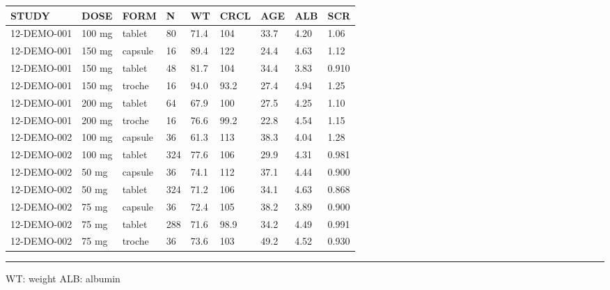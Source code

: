 \documentclass[
]{article}
\newenvironment{Shaded}{\begin{snugshade}}{\end{snugshade}}
\newcommand{\ControlFlowTok}[1]{\textcolor[rgb]{0.13,0.29,0.53}{\textbf{#1}}}
\newcommand{\DataTypeTok}[1]{\textcolor[rgb]{0.13,0.29,0.53}{#1}}
\newcommand{\KeywordTok}[1]{\textcolor[rgb]{0.13,0.29,0.53}{\textbf{#1}}}
\newcommand{\NormalTok}[1]{#1}
\newcommand{\OperatorTok}[1]{\textcolor[rgb]{0.81,0.36,0.00}{\textbf{#1}}}
\newcommand{\StringTok}[1]{\textcolor[rgb]{0.31,0.60,0.02}{#1}}
\begin{document}
\begin{table}[h]
\centering
{\def\arraystretch{1.4}\tabcolsep=5pt
\begin{threeparttable}
\begin{tabular}[h]{lllllllll}
\hline
STUDY & DOSE & FORM & N & WT & CRCL & AGE & ALB & SCR \\
\hline
12-DEMO-001 & 100 mg & tablet & 80 & 71.4 & 104 & 33.7 & 4.20 & 1.06 \\
12-DEMO-001 & 150 mg & capsule & 16 & 89.4 & 122 & 24.4 & 4.63 & 1.12 \\
12-DEMO-001 & 150 mg & tablet & 48 & 81.7 & 104 & 34.4 & 3.83 & 0.910 \\
12-DEMO-001 & 150 mg & troche & 16 & 94.0 & 93.2 & 27.4 & 4.94 & 1.25 \\
12-DEMO-001 & 200 mg & tablet & 64 & 67.9 & 100 & 27.5 & 4.25 & 1.10 \\
12-DEMO-001 & 200 mg & troche & 16 & 76.6 & 99.2 & 22.8 & 4.54 & 1.15 \\
12-DEMO-002 & 100 mg & capsule & 36 & 61.3 & 113 & 38.3 & 4.04 & 1.28 \\
12-DEMO-002 & 100 mg & tablet & 324 & 77.6 & 106 & 29.9 & 4.31 & 0.981 \\
12-DEMO-002 & 50 mg & capsule & 36 & 74.1 & 112 & 37.1 & 4.44 & 0.900 \\
12-DEMO-002 & 50 mg & tablet & 324 & 71.2 & 106 & 34.1 & 4.63 & 0.868 \\
12-DEMO-002 & 75 mg & capsule & 36 & 72.4 & 105 & 38.2 & 3.89 & 0.900 \\
12-DEMO-002 & 75 mg & tablet & 288 & 71.6 & 98.9 & 34.2 & 4.49 & 0.991 \\
12-DEMO-002 & 75 mg & troche & 36 & 73.6 & 103 & 49.2 & 4.52 & 0.930 \\
\hline
\end{tabular}
\end{threeparttable}
}
\vskip 0.67cm
\begin{minipage}{0.8\linewidth}
\linespread{1.1}\selectfont
\rule{1\linewidth}{0.4pt}
\vskip 0.02cm
WT: weight \newline
ALB: albumin \newline
\end{minipage}
\end{table}

\begin{Shaded}
\end{Shaded}
\end{document}
